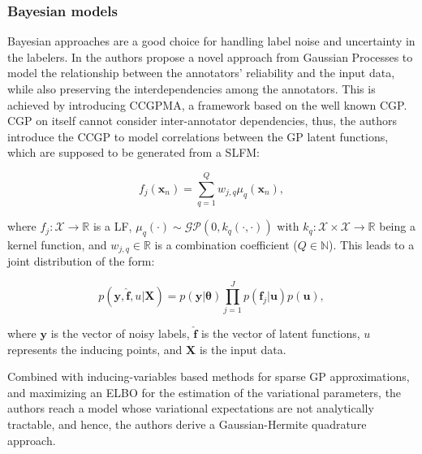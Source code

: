 \subsubsection{Bayesian models}

Bayesian approaches are a good choice for handling label noise
and uncertainty in the labelers. In \cite{GilEtAlvarez2023CCGPMA} the
authors propose a novel approach from Gaussian Processes to model the
relationship between the annotators' reliability and the input data,
while also preserving the interdependencies among the annotators.
This is achieved by introducing \gls{CCGPMA}, a framework based on
the well known \gls{CGP}.
\gls{CGP} on itself cannot consider inter-annotator dependencies,
thus, the authors introduce the \gls{CCGP} to model correlations
between the GP latent functions, which are supposed to be generated
from a \gls{SLFM}:

\begin{equation}
  f_j(\mathbf{x}_n) = \sum_{q=1}^{Q} w_{j,q} \mu_q(\mathbf{x}_n),
\end{equation}

where $f_j : \mathcal{X} \to \mathbb{R}$ is a \gls{LF}, $\mu_q(\cdot) \sim
\mathcal{GP}(0, k_q(\cdot, \cdot))$ with $k_q : \mathcal{X} \times
\mathcal{X} \to \mathbb{R}$ being a kernel function, and $w_{j,q} \in
\mathbb{R}$ is a combination coefficient ($Q \in \mathbb{N}$). This leads
to a joint distribution of the form:

\begin{equation}
  p(\mathbf{y}, \hat{\mathbf{f}}, u | \mathbf{X}) = p(\mathbf{y} |
  \boldsymbol{\theta}) \prod_{j=1}^{J} p(\mathbf{f}_j | \mathbf{u})
  p(\mathbf{u}),
\end{equation}

where $\mathbf{y}$ is the vector of noisy labels, $\hat{\mathbf{f}}$
is the vector of latent functions, $u$ represents the inducing points,
and $\mathbf{X}$ is the input data.

Combined with inducing-variables based methods for sparse GP
approximations, and maximizing an \gls{ELBO} for the estimation of the
variational parameters, the authors reach a model whose variational
expectations are not analytically tractable, and hence, the authors
derive a Gaussian-Hermite quadrature approach.

